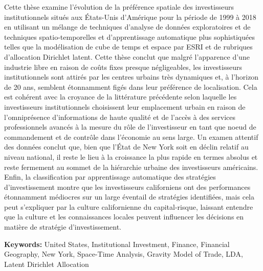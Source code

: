 \documentclass[12pt,letterpaper]{book}
\numberwithin{figure}{chapter}
\newenvironment{preliminary}%
{\pagestyle{plain}\pagenumbering{roman}}%
{\pagenumbering{arabic}}
\begin{document}
\begin{preliminary}
\begin{spacing}{2}
			Cette th\`{e}se examine l'\'{e}volution de la pr\'{e}f\'{e}rence spatiale des investisseurs institutionnels situ\'{e}s aux \'{E}tats-Unis d'Am\'{e}rique pour la p\'{e}riode de 1999 \`{a} 2018 en utilisant un m\'{e}lange de techniques d'analyse de donn\'{e}es exploratoires et de techniques spatio-temporelles et d'apprentissage automatique plus sophistiqu\'{e}es telles que la mod\'{e}lisation de cube de temps et espace par ESRI et de rubriques d'allocation Dirichlet latent. Cette th\`{e}se conclut que malgr\'{e} l'apparence d'une industrie libre en raison de co\^{u}ts fixes presque n\'{e}gligeables, les investisseurs institutionnels sont attir\'{e}s par les centres urbains tr\`{e}s dynamiques et, \`{a} l'horizon de 20 ans, semblent \'{e}tonnamment fig\'{e}s dans leur pr\'{e}f\'{e}rence de localisation. Cela est coh\'{e}rent avec la croyance de la litt\'{e}rature pr\'{e}c\'{e}dente selon laquelle les investisseurs institutionnels choisissent leur emplacement urbain en raison de l'omnipr\'{e}sence d'informations de haute qualit\'{e} et de l'acc\`{e}s \`{a} des services professionnels avanc\'{e}s \`{a} la mesure du r\^{o}le de l'investisseur en tant que noeud de commandement et de contr\^{o}le dans l'\'{e}conomie au sens large. Un examen attentif des donn\'{e}es conclut que, bien que l'\'{E}tat de New York soit en d\'{e}clin relatif au niveau national, il reste le lieu \`{a} la croissance la plus rapide en termes absolus et reste fermement au sommet de la hi\'{e}rarchie urbaine des investisseurs am\'{e}ricains. Enfin, la classification par apprentissage automatique des strat\'{e}gies d'investissement montre que les investisseurs californiens ont des performances \'{e}tonnamment m\'{e}diocres sur un large \'{e}ventail de strat\'{e}gies identifi\'{e}es, mais cela peut s'expliquer par la culture californienne du capital-risque, laissant entendre que la culture et les connaissances locales peuvent influencer les d\'{e}cisions en mati\`{e}re de strat\'{e}gie d'investissement.
			
			
		\end{spacing}
		
		
		
		\vfill
		\textbf{Keywords:} United States, Institutional Investment, Finance, Financial Geography, New York, Space-Time Analysis, Gravity Model of Trade, LDA, Latent Dirichlet Allocation 
		\newpage
		

\end{preliminary}
\end{document}
